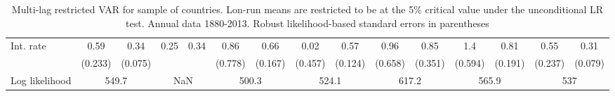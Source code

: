 \begin{table}[htbp]
\begin{tabular}{@{\extracolsep{4pt}}lcccccccccccccc@{}}
\quad Int. rate 	 &0.59 	 & 0.34 	 & 0.25 	 & 0.34 	 & 0.86 	 & 0.66 	 & 0.02 	 & 0.57 	 & 0.96 	 & 0.85 	 & 1.4 	 & 0.81 	 & 0.55 	 & 0.31	 \\ 
 		 & (0.233) 	 & (0.075) 	 &  	 &  	 & (0.778) 	 & (0.167) 	 & (0.457) 	 & (0.124) 	 & (0.658) 	 & (0.351) 	 & (0.594) 	 & (0.191) 	 & (0.237) 	 & (0.079) 	 \\ 
 \hline \rule{0pt}{4ex} 
  Log likelihood 	 &\multicolumn{2}{c}{549.7} 	 & \multicolumn{2}{c}{NaN} 	 & \multicolumn{2}{c}{500.3} 	 & \multicolumn{2}{c}{524.1} 	 & \multicolumn{2}{c}{617.2} 	 & \multicolumn{2}{c}{565.9} 	 & \multicolumn{2}{c}{537}\\ 

 \hline 	\end{tabular}		\caption{Multi-lag restricted VAR for sample of countries. Lon-run means are
                            restricted to be at the 5\% critical value under the unconditional
                            LR test. Annual data 1880-2013. Robust likelihood-based standard errors in parentheses}
		\label{tab:all_rest_4lag}

\end{table}